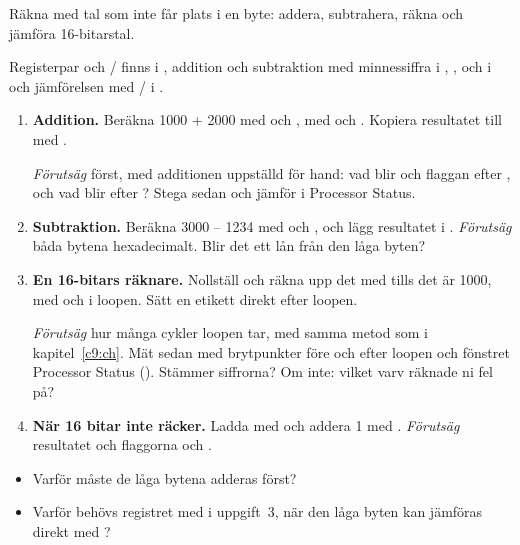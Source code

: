 \label{lab3:d19}
Räkna med tal som inte får plats i en byte: addera, subtrahera, räkna och jämföra 16-bitarstal.

Registerpar och / finns i , addition och subtraktion med
minnessiffra i , ,  och  i  och
jämförelsen med / i .

\begin{enumerate}
  \item \textbf{Addition.} Beräkna 1000 + 2000 med  och , med
     och . Kopiera resultatet till  med .

    \emph{Förutsäg} först, med additionen uppställd för hand: vad blir  och flaggan
     efter , och vad blir  efter ? Stega sedan och jämför i
    Processor Status.
  \item \textbf{Subtraktion.} Beräkna 3000 -- 1234 med  och , och lägg
    resultatet i . \emph{Förutsäg} båda bytena hexadecimalt. Blir det ett lån från
    den låga byten?
  \item \textbf{En 16-bitars räknare.} Nollställ  och räkna upp det med 
    tills det är 1000, med  och  i loopen. Sätt en etikett direkt efter loopen.

    \emph{Förutsäg} hur många cykler loopen tar, med samma metod som i kapitel~\ref{c9:ch}. Mät
    sedan med brytpunkter före och efter loopen och fönstret Processor Status
    (). Stämmer siffrorna? Om inte: vilket varv räknade ni fel på?
  \item \textbf{När 16 bitar inte räcker.} Ladda  med  och addera 1 med
    . \emph{Förutsäg} resultatet och flaggorna  och .
\end{enumerate}

\begin{itemize}
  \item Varför måste de låga bytena adderas först?
  \item Varför behövs registret med  i uppgift~3, när den låga byten kan jämföras
    direkt med ?
\end{itemize}


